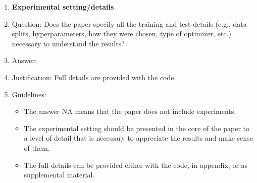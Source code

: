 \documentclass{article}
\begin{document}
\begin{enumerate}
\item {\bf Experimental setting/details}
    \item[] Question: Does the paper specify all the training and test details (e.g., data splits, hyperparameters, how they were chosen, type of optimizer, etc.) necessary to understand the results?
    \item[] Answer: \answerYes{} %
    \item[] Justification: Full details are provided with the code.
    \item[] Guidelines:
    \begin{itemize}
        \item The answer NA means that the paper does not include experiments.
        \item The experimental setting should be presented in the core of the paper to a level of detail that is necessary to appreciate the results and make sense of them.
        \item The full details can be provided either with the code, in appendix, or as supplemental material.
    \end{itemize}


\end{enumerate}
\end{document}
